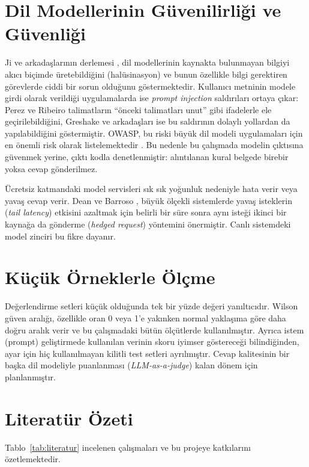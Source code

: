 \section{Dil Modellerinin Güvenilirliği ve Güvenliği}

Ji ve arkadaşlarının derlemesi \cite{ji2023}, dil modellerinin kaynakta bulunmayan bilgiyi akıcı
biçimde üretebildiğini (halüsinasyon) ve bunun özellikle bilgi gerektiren görevlerde ciddi bir sorun
olduğunu göstermektedir. Kullanıcı metninin modele girdi olarak verildiği uygulamalarda ise
\textit{prompt injection} saldırıları ortaya çıkar: Perez ve Ribeiro \cite{perez2022} talimatların
``önceki talimatları unut'' gibi ifadelerle ele geçirilebildiğini, Greshake ve arkadaşları
\cite{greshake2023} ise bu saldırının dolaylı yollardan da yapılabildiğini göstermiştir. OWASP, bu
riski büyük dil modeli uygulamaları için en önemli risk olarak listelemektedir \cite{owasp2025}. Bu
nedenle bu çalışmada modelin çıktısına güvenmek yerine, çıktı kodla denetlenmiştir: alıntılanan kural
belgede birebir yoksa cevap gönderilmez.

Ücretsiz katmandaki model servisleri sık sık yoğunluk nedeniyle hata verir veya yavaş cevap verir.
Dean ve Barroso \cite{dean2013}, büyük ölçekli sistemlerde yavaş isteklerin (\textit{tail latency})
etkisini azaltmak için belirli bir süre sonra aynı isteği ikinci bir kaynağa da gönderme
(\textit{hedged request}) yöntemini önermiştir. Canlı sistemdeki model zinciri bu fikre dayanır.

\section{Küçük Örneklerle Ölçme}

Değerlendirme setleri küçük olduğunda tek bir yüzde değeri yanıltıcıdır. Wilson \cite{wilson1927}
güven aralığı, özellikle oran 0 veya 1'e yakınken normal yaklaşıma göre daha doğru aralık verir ve bu
çalışmadaki bütün ölçütlerde kullanılmıştır. Ayrıca istem (prompt) geliştirmede kullanılan verinin
skoru iyimser göstereceği bilindiğinden, ayar için hiç kullanılmayan kilitli test setleri
ayrılmıştır. Cevap kalitesinin bir başka dil modeliyle puanlanması (\textit{LLM-as-a-judge})
\cite{zheng2023} kalan dönem için planlanmıştır.

\section{Literatür Özeti}

Tablo~\ref{tab:literatur} incelenen çalışmaları ve bu projeye katkılarını özetlemektedir.

